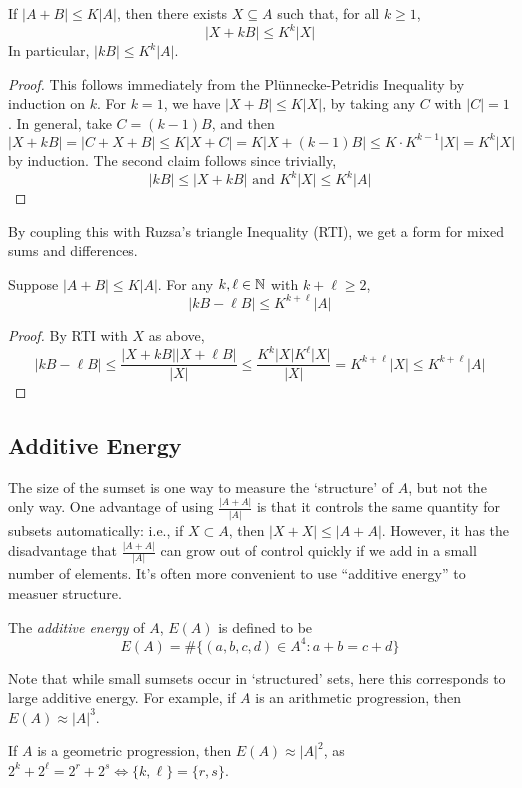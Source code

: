 \documentclass[10pt,a4paper]{article}
\begin{document}
\begin{corollary}
  If $|A+B|\leq K|A|$, then there exists $X \subseteq A$ such that, for all $k\geq 1$,
  \[|X+kB| \leq K^k|X|\]
  In particular, $|kB| \leq K^{k}|A|$.
\end{corollary}
\begin{proof}
  This follows immediately from the Pl\"unnecke-Petridis Inequality by induction on $k$. For $k=1$, we have $|X+B|\leq K|X|$, by taking any $C$ with $|C|=1$. In general, take $C = (k-1)B$, and then
  \[|X+kB| = |C+X+B| \leq K|X+C| = K|X+(k-1)B| \leq K\cdot K^{k-1}|X| = K^k|X|\]
  by induction. The second claim follows since trivially,
  \[|kB| \leq |X+kB| \text{ and } K^k|X| \leq K^k|A|\]
\end{proof}
By coupling this with Ruzsa's triangle Inequality (RTI), we get a form for mixed sums and differences.
\begin{corollary}
  Suppose $|A+B|\leq K|A|$. For any $k, \ell \in \mathbb{N}$ with $k+\ell \geq 2$,
  \[|kB - \ell B| \leq K^{k+\ell}|A|\]
\end{corollary}
\begin{proof}
  By RTI with $X$ as above,
  \[|kB-\ell B| \leq \frac{|X+kB||X+\ell B|}{|X|} \leq \frac{K^k|X|K^\ell|X|}{|X|} =K^{k+\ell}|X| \leq K^{k+\ell}|A|\]
\end{proof}
\subsection{Additive Energy}
The size of the sumset is one way to measure the `structure' of $A$, but not the only way. One advantage of using $\frac{|A+A|}{|A|}$ is that it controls the same quantity for subsets automatically: i.e., if $X \subset A$, then $|X+X| \leq |A+A|$. However, it has the disadvantage that $\frac{|A+A|}{|A|}$ can grow out of control quickly if we add in a small number of elements. It's often more convenient to use ``additive energy'' to measuer structure.
\begin{definition}
  The \emph{additive energy} of $A$, $E(A)$ is defined to be
  \[E(A) = \#\{(a,b,c,d) \in A^4: a+b=c+d\}\]
\end{definition}
Note that while small sumsets occur in `structured' sets, here this corresponds to large additive energy. For example, if $A$ is an arithmetic progression, then $E(A) \approx |A|^3$.

If $A$ is a geometric progression, then $E(A) \approx |A|^2$, as $2^k + 2^\ell = 2^r + 2^s \iff \{k,\ell\} = \{r,s\}$.
\end{document}
